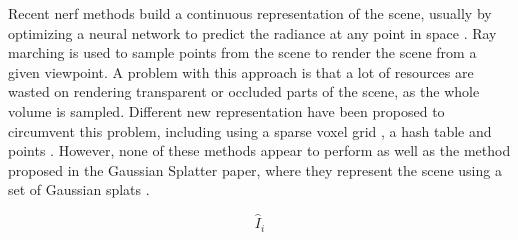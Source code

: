 Recent \gls{nerf} methods build a continuous representation of the scene, usually by optimizing a neural network to predict the radiance at any point in space \cite{mildenhallNeRFRepresentingScenes2020a}.
Ray marching is used to sample points from the scene to render the scene from a given viewpoint.
A problem with this approach is that a lot of resources are wasted on rendering transparent or occluded parts of the scene, as the whole volume is sampled.
Different new representation have been proposed to circumvent this problem, including using a sparse voxel grid \cite{yuPlenoxelsRadianceFields2021a}, a hash table \cite{mullerInstantNeuralGraphics2022} and points \cite{xuPointNeRFPointbasedNeural2023}.
However, none of these methods appear to perform as well as the method proposed in the Gaussian Splatter paper, where they represent the scene using a set of Gaussian splats \cite{kerbl3DGaussianSplatting2023}.



\begin{equation}
    \hat{I}_i
\end{equation}
